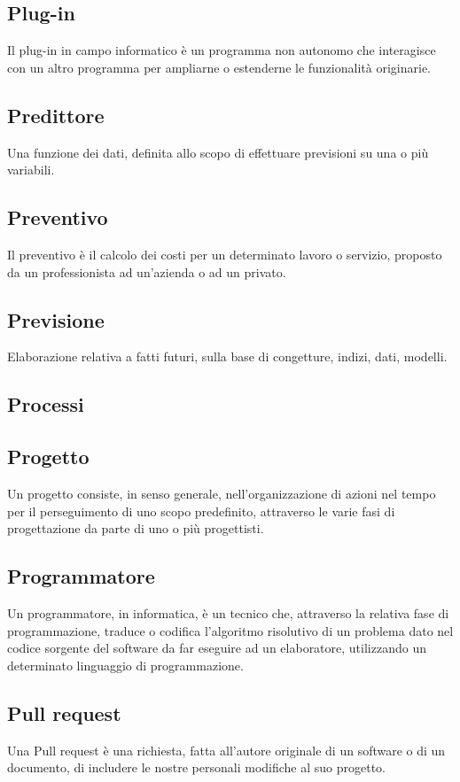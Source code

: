 
\subsection*{Plug-in}
Il plug-in in campo informatico è un programma non autonomo che interagisce con un altro programma per ampliarne o estenderne le funzionalità originarie.

\subsection*{Predittore}
Una funzione dei dati, definita allo scopo di effettuare previsioni su una o più variabili.

\subsection*{Preventivo}
Il preventivo è il calcolo dei costi per un determinato lavoro o servizio, proposto da un professionista ad un'azienda o ad un privato.

\subsection*{Previsione}
Elaborazione relativa a fatti futuri, sulla base di congetture, indizi, dati, modelli.

\subsection*{Processi}

\subsection*{Progetto}
Un progetto consiste, in senso generale, nell'organizzazione di azioni nel tempo per il perseguimento di uno scopo predefinito, attraverso le varie fasi di progettazione da parte di uno o più progettisti.

\subsection*{Programmatore}
Un programmatore, in informatica, è un tecnico che, attraverso la relativa fase di programmazione, traduce o codifica l'algoritmo risolutivo di un problema dato nel codice sorgente del software da far eseguire ad un elaboratore, utilizzando un determinato linguaggio di programmazione.

\subsection*{Pull request}
Una Pull request è una richiesta, fatta all’autore originale di un software o di un documento, di includere le nostre personali modifiche al suo progetto.


